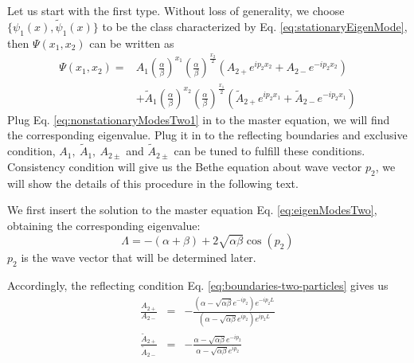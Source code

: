\documentclass[12pt,a4paper]{article}
\begin{document}
Let us start with the first type. Without loss of generality, we choose
$\{\psi_1(x), \tilde{\psi}_1(x)\}$ to be the class characterized by Eq.
\eqref{eq:stationaryEigenMode}, then $\Psi(x_1, x_2)$ can be written as
\begin{equation}
    \begin{aligned}
        \label{eq:nonstationaryModesTwo1}
        \Psi(x_1, x_2) = & A_{1}\left(\frac{\alpha}{\beta}\right)^{x_1} 
        \left(\frac{\alpha}{\beta}\right)^{\frac{x_2}{2}} \left( A_{2+} 
            e^{ip_2 x_2} + A_{2-} e^{-ip_2 x_2}\right) \\
        & + \tilde{A}_{1}\left(\frac{\alpha}{\beta}\right)^{x_2} \left(
            \frac{\alpha}{\beta}\right)^{\frac{x_1}{2}} \left( \tilde{A}_{2+}
            e^{ip_2 x_1} + \tilde{A}_{2-} e^{-ip_2 x_1}\right) 
    \end{aligned}
\end{equation}
Plug Eq. \eqref{eq:nonstationaryModesTwo1} in to the master equation, we will
find the corresponding eigenvalue. Plug it in to the reflecting boundaries and
exclusive condition, $A_{1},~\tilde{A}_{1},~A_{2\pm}$ and $\tilde{A}_{2\pm}$ can
be tuned to fulfill these conditions. Consistency condition will give us the
Bethe equation about wave vector $p_2$, we will show the details of this
procedure in the following text.

We first insert the solution to the master equation Eq. \eqref{eq:eigenModesTwo},
obtaining the corresponding eigenvalue:
\begin{equation}
    \label{eq:eigenvaluesTwo1}
    \Lambda = -(\alpha+\beta) + 2\sqrt{\alpha\beta}\cos(p_2)
\end{equation} 
$p_2$ is the wave vector that will be determined later. 

Accordingly, the reflecting condition Eq. \eqref{eq:boundaries-two-particles}
gives us
\begin{subequations}
    \label{eq:scatterFactorBoundary}
    \begin{eqnarray}
        \frac{A_{2+}}{A_{2-}} & = & -\frac{\left(\alpha-\sqrt{\alpha\beta}
                e^{-ip_2}\right) e^{-ip_2L}}{\left(\alpha-\sqrt{\alpha\beta} 
                e^{ip_2}\right) e^{ip_2L}}  \\
        \frac{\tilde{A}_{2+}}{\tilde{A}_{2-}} & = & -\frac{\alpha -
            \sqrt{\alpha\beta} e^{-ip_2}}{\alpha-\sqrt{\alpha\beta} e^{ip_2}} 
    \end{eqnarray}
\end{subequations}
\end{document}
